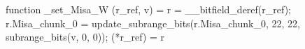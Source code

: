 function _set_Misa_W (r_ref, v) = {
    r = __bitfield_deref(r_ref);
    r.Misa_chunk_0 = update_subrange_bits(r.Misa_chunk_0, 22, 22, subrange_bits(v, 0, 0));
    (*r_ref) = r
}
